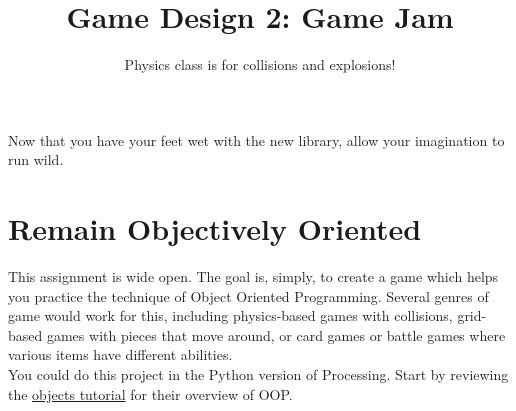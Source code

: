 \documentclass{42-en}
\begin{document}
\title{Game Design 2: Game Jam}
\subtitle{Physics class is for collisions and explosions!}


\summary
{
	Now that you have your feet wet with the new library, allow your imagination to run wild.
}

\maketitle

\tableofcontents


\chapter{Remain Objectively Oriented}

This assignment is wide open. The goal is, simply, to create a game which helps you practice the technique of Object Oriented Programming. Several genres of game would work for this, including physics-based games with collisions, grid-based games with pieces that move around, or card games or battle games where various items have different abilities.\\


You could do this project in the Python version of Processing. Start by reviewing the \href{http://py.processing.org/tutorials/objects/}{objects tutorial} for their overview of OOP.\\
\end{document}
